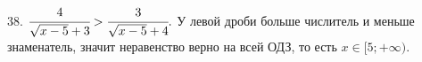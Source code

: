 38. $\cfrac{4}{\sqrt{x-5}+3}>\cfrac{3}{\sqrt{x-5}+4}.$ У левой дроби больше числитель и меньше знаменатель, значит неравенство верно на всей ОДЗ, то есть $x\in[5;+\infty).$\\
